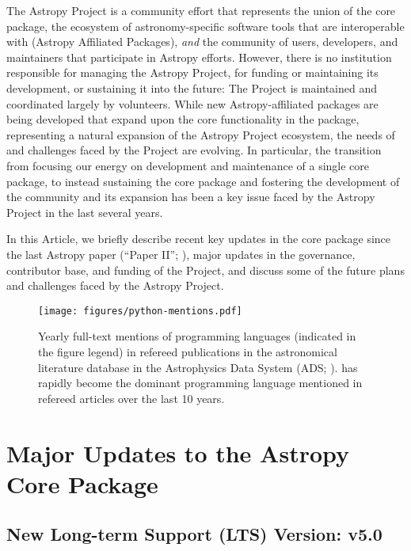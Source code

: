 \documentclass[modern]{aastex631}
\begin{document}
The Astropy Project is a community effort that represents the union of the
\astropypkg core package, the ecosystem of astronomy-specific software tools
that are interoperable with \astropypkg (Astropy Affiliated Packages),
\emph{and} the community of users, developers, and maintainers that participate
in Astropy efforts.
However, there is no institution responsible for managing the Astropy Project,
for funding or maintaining its development, or sustaining it into the future:
The Project is maintained and coordinated largely by volunteers.
While new Astropy-affiliated packages are being developed that expand upon the
core functionality in the \astropypkg package, representing a natural expansion
of the Astropy Project ecosystem, the needs of and challenges faced by the
Project are evolving.
In particular, the transition from focusing our energy on development and
maintenance of a single core package, to instead sustaining the core package and
fostering the development of the community and its expansion has been a key
issue faced by the Astropy Project in the last several years.

In this Article, we briefly describe recent key updates in the \astropypkg core
package since the last Astropy paper (``Paper II''; \citealt{astropy:2018}),
major updates in the governance, contributor base, and funding of the Project,
and discuss some of the future plans and challenges faced by the Astropy
Project.


\begin{figure}
    \begin{centering}
        \texttt{[image: figures/python-mentions.pdf]}
        \caption{
            Yearly full-text mentions of programming languages (indicated in the
            figure legend) in refereed publications in the astronomical
            literature database in the Astrophysics Data System (ADS;
            \citealt{ads}).
            \python has rapidly become the dominant programming language
            mentioned in refereed articles over the last 10 years.
        }
        \label{fig:python-mentions}
    \end{centering}
\end{figure}


\section{Major Updates to the Astropy Core Package} \label{sec:core-updates}

\subsection{New Long-term Support (LTS) Version: v5.0} \label{sec:core-v50}
\end{document}
